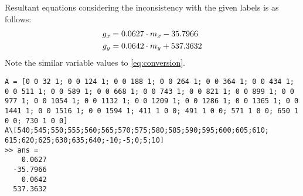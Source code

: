 \documentclass[a4paper]{article}
\begin{document}
Resultant equations considering the inconsistency with the given labels is as follows:
\begin{equation}{\label{eq:conversionbetter}}
	\begin{aligned}
		g_x &=  0.0627 \cdot m_x - 35.7966\\
		g_y &=  0.0642 \cdot m_y + 537.3632
	\end{aligned}
\end{equation}
Note the similar variable values to \ref{eq:conversion}.
\begin{verbatim}
A = [0 0 32 1; 0 0 124 1; 0 0 188 1; 0 0 264 1; 0 0 364 1; 0 0 434 1; 0 0 511 1; 0 0 589 1; 0 0 668 1; 0 0 743 1; 0 0 821 1; 0 0 899 1; 0 0 977 1; 0 0 1054 1; 0 0 1132 1; 0 0 1209 1; 0 0 1286 1; 0 0 1365 1; 0 0 1441 1; 0 0 1516 1; 0 0 1594 1; 411 1 0 0; 491 1 0 0; 571 1 0 0; 650 1 0 0; 730 1 0 0]
A\[540;545;550;555;560;565;570;575;580;585;590;595;600;605;610; 615;620;625;630;635;640;-10;-5;0;5;10]
>> ans =
    0.0627
  -35.7966
    0.0642
  537.3632
\end{verbatim}
\end{document}
